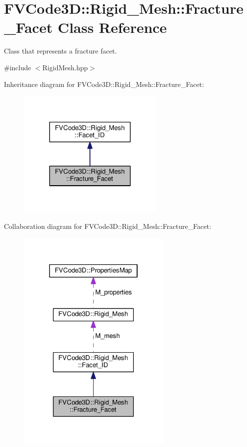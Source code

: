\hypertarget{classFVCode3D_1_1Rigid__Mesh_1_1Fracture__Facet}{}\section{F\+V\+Code3D\+:\+:Rigid\+\_\+\+Mesh\+:\+:Fracture\+\_\+\+Facet Class Reference}
\label{classFVCode3D_1_1Rigid__Mesh_1_1Fracture__Facet}


Class that represents a fracture facet.  




{\ttfamily \#include $<$Rigid\+Mesh.\+hpp$>$}



Inheritance diagram for F\+V\+Code3D\+:\+:Rigid\+\_\+\+Mesh\+:\+:Fracture\+\_\+\+Facet\+:
\nopagebreak
\begin{figure}[H]
\begin{center}
\leavevmode
\includegraphics[width=203pt]{classFVCode3D_1_1Rigid__Mesh_1_1Fracture__Facet__inherit__graph}
\end{center}
\end{figure}


Collaboration diagram for F\+V\+Code3D\+:\+:Rigid\+\_\+\+Mesh\+:\+:Fracture\+\_\+\+Facet\+:
\nopagebreak
\begin{figure}[H]
\begin{center}
\leavevmode
\includegraphics[width=214pt]{classFVCode3D_1_1Rigid__Mesh_1_1Fracture__Facet__coll__graph}
\end{center}
\end{figure}
